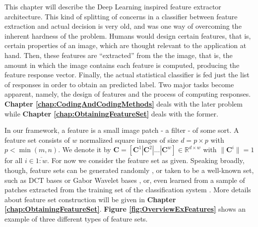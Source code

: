 \documentclass[12pt,a4paper,oneside,english]{UPBThesis}
\newcommand{\hctimes}[2]{{#1}\!\times\!{#2}}
\newcommand{\hcrange}[2]{\overline{{#1}\colon\!\!{#2}}}
\begin{document}
This chapter will describe the Deep Learning inspired feature extractor architecture. This kind of splitting of concerns in a classifier between feature extraction and actual decision is very old, and was one way of overcoming the inherent hardness of the problem. Humans would design certain features, that is, certain properties of an image, which are thought relevant to the application at hand. Then, these features are ``extracted'' from the the image, that is, the amount in which the image contains each feature is computed, producing the feature response vector. Finally, the actual statistical classifier is fed just the list of responses in order to obtain an predicted label. Two major tasks become apparent, namely, the design of features and the process of computing responses. \textbf{Chapter \ref{chap:CodingAndCodingMethods}} deals with the later problem while \textbf{Chapter \ref{chap:ObtainingFeatureSet}} deals with the former.

In our framework, a feature is a small image patch - a filter - of some sort. A feature set consists of $w$ normalized square images of size $d = \hctimes{p}{p}$ with $p < \min(m,n)$. We denote it by $\textbf{C} = \left[ \textbf{C}^1 \left|\right. \textbf{C}^2 \left|\right. \dots \left|\right. \textbf{C}^w \right] \in \mathbb{R}^{\hctimes{d}{w}}$ with $\|\mathbf{C}^i\| = 1$ for all $i \in \hcrange{1}{w}$. For now we consider the feature set as given. Speaking broadly, though, feature sets can be generated randomly \cite{random-weights-feature-learning,beyond-simple-features}, or taken to be a well-known set, such as DCT bases or Gabor Wavelet bases \cite{simple-method-sparse-coding}, or, even learned from a sample of patches extracted from the training set of the classification system \cite{emergence-sparse-coding,sparse-coding-strategy-V1,tiny-images}. More details about feature set construction will be given in \textbf{Chapter \ref{chap:ObtainingFeatureSet}}. \textbf{Figure \ref{fig:OverviewExFeatures}} shows an example of three different types of feature sets.
\end{document}
